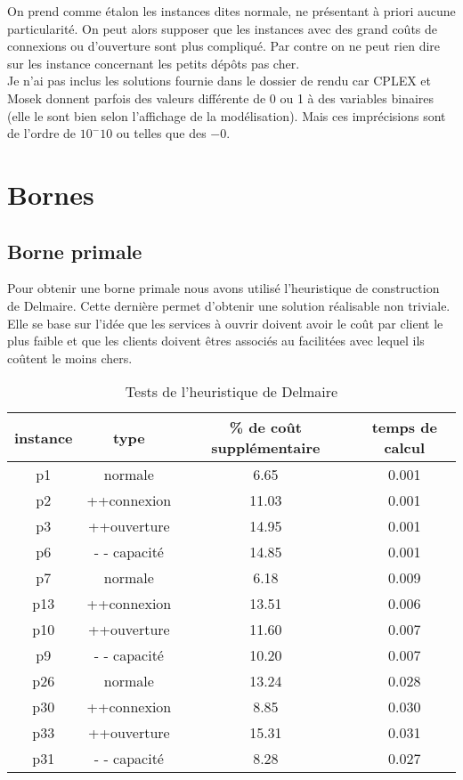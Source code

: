 \documentclass[12pt,a4paper]{article}
\begin{document}
On prend comme étalon les instances dites normale, ne présentant à priori aucune particularité. On peut alors supposer que les instances avec des grand coûts de connexions ou d'ouverture sont plus compliqué. Par contre on ne peut rien dire sur les instance concernant les petits dépôts pas cher.\\

Je n'ai pas inclus les solutions fournie dans le dossier de rendu car CPLEX et Mosek donnent parfois des valeurs différente de 0 ou 1 à des variables binaires (elle le sont bien selon l'affichage de la modélisation). Mais ces imprécisions sont de l'ordre de $10^-10$ ou telles que des $-0$.

\section{Bornes}

\subsection{Borne primale}

Pour obtenir une borne primale nous avons utilisé l'heuristique de construction de Delmaire. Cette dernière permet d'obtenir une solution réalisable non triviale. Elle se base sur l’idée que les services à ouvrir doivent avoir le coût par client le plus faible et que les clients doivent êtres associés au facilitées avec lequel ils coûtent le moins chers.\\

\begin{table}[!h]
\centering
\begin{tabular}{|c|c|c|c|}
  \hline
  instance & type & \% de coût supplémentaire & temps de calcul \\
  \hline
	p1 & normale & 6.65 & 0.001 \\
	p2 & ++connexion & 11.03 & 0.001 \\
	p3 & ++ouverture & 14.95 & 0.001 \\
	p6 & - - capacité & 14.85 & 0.001 \\
  \hline
	p7 & normale & 6.18 & 0.009 \\
	p13 & ++connexion & 13.51 & 0.006 \\
	p10 & ++ouverture & 11.60 & 0.007 \\
	p9 & - - capacité & 10.20 & 0.007 \\
  \hline	
	p26 & normale & 13.24 & 0.028 \\
	p30 & ++connexion & 8.85 & 0.030 \\
	p33 & ++ouverture & 15.31 & 0.031 \\
	p31 & - - capacité & 8.28 & 0.027 \\
  \hline
\end{tabular}
\caption{Tests de l'heuristique de Delmaire}
\label{delmaire}
\end{table}
\end{document}
